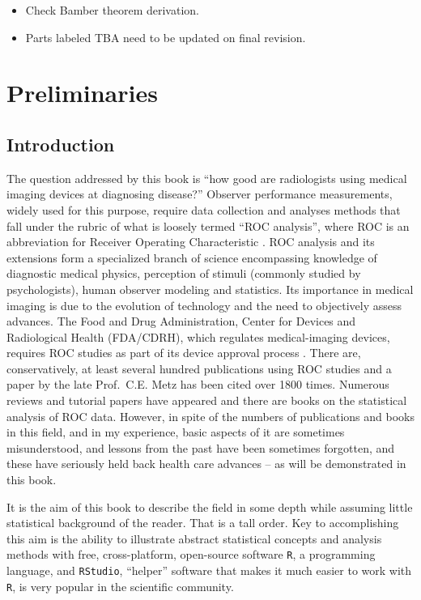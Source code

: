 \documentclass[
]{book}
\providecommand{\tightlist}{%
  \setlength{\itemsep}{0pt}\setlength{\parskip}{0pt}}
\begin{document}
\begin{itemize}
\tightlist
\item
  Check Bamber theorem derivation.
\item
  Parts labeled TBA need to be updated on final revision.
\end{itemize}

\hypertarget{preliminaries}{%
\chapter{Preliminaries}\label{preliminaries}}

\hypertarget{preliminariesIntro}{%
\section{Introduction}\label{preliminariesIntro}}

The question addressed by this book is ``how good are radiologists using medical imaging devices at diagnosing disease?'' Observer performance measurements, widely used for this purpose, require data collection and analyses methods that fall under the rubric of what is loosely termed ``ROC analysis'', where ROC is an abbreviation for Receiver Operating Characteristic \citep{RN1766}. ROC analysis and its extensions form a specialized branch of science encompassing knowledge of diagnostic medical physics, perception of stimuli (commonly studied by psychologists), human observer modeling and statistics. Its importance in medical imaging is due to the evolution of technology and the need to objectively assess advances. The Food and Drug Administration, Center for Devices and Radiological Health (FDA/CDRH), which regulates medical-imaging devices, requires ROC studies as part of its device approval process . There are, conservatively, at least several hundred publications using ROC studies and a paper \citep{RN1766} by the late Prof.~C.E. Metz has been cited over 1800 times. Numerous reviews and tutorial papers have appeared \citep[\citet{RN113}, \citet{RN1908}, \citet{RN1973}]{RN1766} and there are books on the statistical analysis \citep{RN1443} of ROC data. However, in spite of the numbers of publications and books in this field, and in my experience, basic aspects of it are sometimes misunderstood, and lessons from the past have been sometimes forgotten, and these have seriously held back health care advances -- as will be demonstrated in this book.

It is the aim of this book to describe the field in some depth while assuming little statistical background of the reader. That is a tall order. Key to accomplishing this aim is the ability to illustrate abstract statistical concepts and analysis methods with free, cross-platform, open-source software \texttt{R}, a programming language, and \texttt{RStudio}, ``helper'' software that makes it much easier to work with \texttt{R}, is very popular in the scientific community.
\end{document}
